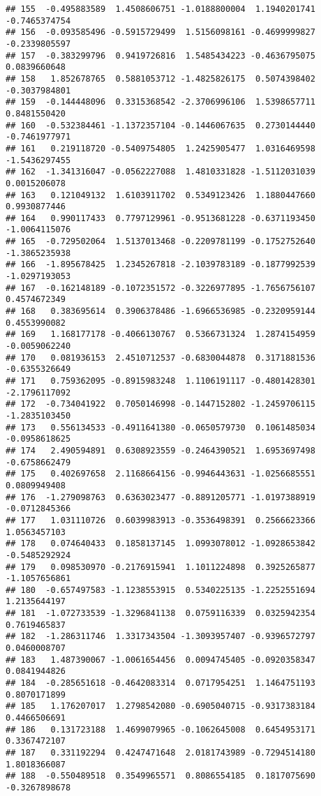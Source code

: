 \documentclass[
]{article}
\begin{document}
\begin{verbatim}
## 155  -0.495883589  1.4508606751 -1.0188800004  1.1940201741 -0.7465374754
## 156  -0.093585496 -0.5915729499  1.5156098161 -0.4699999827 -0.2339805597
## 157  -0.383299796  0.9419726816  1.5485434223 -0.4636795075  0.0839660648
## 158   1.852678765  0.5881053712 -1.4825826175  0.5074398402 -0.3037984801
## 159  -0.144448096  0.3315368542 -2.3706996106  1.5398657711  0.8481550420
## 160  -0.532384461 -1.1372357104 -0.1446067635  0.2730144440 -0.7461977971
## 161   0.219118720 -0.5409754805  1.2425905477  1.0316469598 -1.5436297455
## 162  -1.341316047 -0.0562227088  1.4810331828 -1.5112031039  0.0015206078
## 163   0.121049132  1.6103911702  0.5349123426  1.1880447660  0.9930877446
## 164   0.990117433  0.7797129961 -0.9513681228 -0.6371193450 -1.0064115076
## 165  -0.729502064  1.5137013468 -0.2209781199 -0.1752752640 -1.3865235938
## 166  -1.895678425  1.2345267818 -2.1039783189 -0.1877992539 -1.0297193053
## 167  -0.162148189 -0.1072351572 -0.3226977895 -1.7656756107  0.4574672349
## 168   0.383695614  0.3906378486 -1.6966536985 -0.2320959144  0.4553990082
## 169   1.168177178 -0.4066130767  0.5366731324  1.2874154959 -0.0059062240
## 170   0.081936153  2.4510712537 -0.6830044878  0.3171881536 -0.6355326649
## 171   0.759362095 -0.8915983248  1.1106191117 -0.4801428301 -2.1796117092
## 172  -0.734041922  0.7050146998 -0.1447152802 -1.2459706115 -1.2835103450
## 173   0.556134533 -0.4911641380 -0.0650579730  0.1061485034 -0.0958618625
## 174   2.490594891  0.6308923559 -0.2464390521  1.6953697498 -0.6758662479
## 175   0.402697658  2.1168664156 -0.9946443631 -1.0256685551  0.0809949408
## 176  -1.279098763  0.6363023477 -0.8891205771 -1.0197388919 -0.0712845366
## 177   1.031110726  0.6039983913 -0.3536498391  0.2566623366  1.0563457103
## 178   0.074640433  0.1858137145  1.0993078012 -1.0928653842 -0.5485292924
## 179   0.098530970 -0.2176915941  1.1011224898  0.3925265877 -1.1057656861
## 180  -0.657497583 -1.1238553915  0.5340225135 -1.2252551694  1.2135644197
## 181  -1.072733539 -1.3296841138  0.0759116339  0.0325942354  0.7619465837
## 182  -1.286311746  1.3317343504 -1.3093957407 -0.9396572797  0.0460008707
## 183   1.487390067 -1.0061654456  0.0094745405 -0.0920358347  0.0841944826
## 184  -0.285651618 -0.4642083314  0.0717954251  1.1464751193  0.8070171899
## 185   1.176207017  1.2798542080 -0.6905040715 -0.9317383184  0.4466506691
## 186   0.131723188  1.4699079965 -0.1062645008  0.6454953171  0.3367472107
## 187   0.331192294  0.4247471648  2.0181743989 -0.7294514180  1.8018366087
## 188  -0.550489518  0.3549965571  0.8086554185  0.1817075690 -0.3267898678

\end{verbatim}
\end{document}
